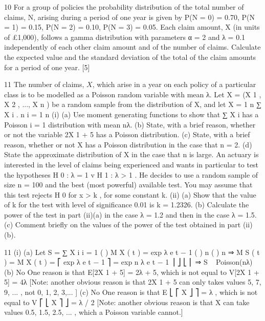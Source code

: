 \documentclass[a4paper,12pt]{article}
\begin{document}
\begin{enumerate}
10
For a group of policies the probability distribution of the total number of claims, N,
arising during a period of one year is given by
P(N = 0) = 0.70, P(N = 1) = 0.15, P(N = 2) = 0.10, P(N = 3) = 0.05.
Each claim amount, X (in units of £1,000), follows a gamma distribution with parameters α = 2 and λ = 0.1 independently of each other claim amount and of the number of claims.
Calculate the expected value and the standard deviation of the total of the claim amounts for a period of one year.
[5]

11
The number of claims, $X$, which arise in a year on each policy of a particular class is to be modelled as a Poisson random variable with mean λ. Let X = (X 1 , X 2 , ..., X n ) be a random sample from the distribution of X, and let X =
1 n
∑ X i .
n i = 1
n
(i)
(a)
Use moment generating functions to show that
∑ X i has a Poisson
i = 1
distribution with mean nλ.
(b) State, with a brief reason, whether or not the variable 2X 1 + 5 has a Poisson distribution.
(c) State, with a brief reason, whether or not X has a Poisson distribution in the case that n = 2.
(d) State the approximate distribution of X in the case that n is large.
An actuary is interested in the level of claims being experienced and wants in particular to test the hypotheses
H 0 : λ = 1 v H 1 : λ > 1 .
He decides to use a random sample of size n = 100 and the best (most powerful) available test. You may assume that this test rejects H 0 for x > k , for some constant k.
(ii)
(a) Show that the value of k for the test with level of significance 0.01 is k = 1.2326.
(b) Calculate the power of the test in part (ii)(a) in the case λ = 1.2 and then in the case λ = 1.5.
(c) Comment briefly on the values of the power of the test obtained in part
(ii)(b).
\newpage

11
(i)
(a)
Let S = ∑ X i
i = 1
{ (
) }
M X ( t ) = exp λ e t − 1
{ (
) }
n
{ (
) }
n
⇒ M S ( t ) = { M X ( t ) } = ⎡ exp λ e t − 1 ⎤ = exp n λ e t − 1
⎥ ⎦
⎣ ⎢
⇒ S ~ Poisson(nλ)
(b)
No
One reason is that E[2X 1 + 5] = 2λ + 5, which is not equal to V[2X 1 + 5] = 4λ
[Note: another obvious reason is that 2X 1 + 5 can only takes values 5,
7, 9, ... , not 0, 1, 2, 3,... ]
(c)
No
One reason is that E ⎣ ⎡ X ⎦ ⎤ = λ , which is not equal to V ⎡ ⎣ X ⎤ ⎦ = λ / 2
[Note: another obvious reason is that X can take values 0.5, 1.5, 2.5, ... , which a Poisson variable cannot.]


\end{enumerate}
\end{document}
